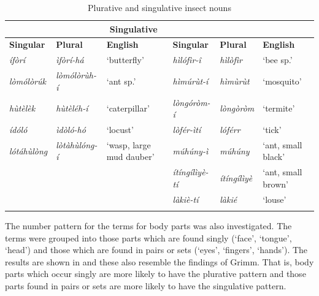 \documentclass[output=paper]{langsci/langscibook}
\begin{document}
\begin{table}
\begin{tabularx}{\textwidth}{llXllX}
\lsptoprule

\multicolumn{3}{c}{\textbf{Plurative}} & \multicolumn{3}{c}{\textbf{Singulative}}\\ \midrule
 \textbf{Singular} & \textbf{Plural} & \textbf{English} & \textbf{Singular} & \textbf{Plural} & \textbf{English}\\ \midrule
\itshape \'{i}f\`{o}r\'{i} & \itshape \`{i}f\`{o}r\'{i}-h\'{a} & ‘butterfly’ & \itshape h\`{i}l\'{o}f\`{i}r-\^{i} & \itshape h\`{i}l\`{o}f\`{i}r & ‘bee sp.’\\
\itshape l\`{o}m\'{o}l\`{o}r\'{u}k & \itshape l\`{o}m\'{o}l\`{o}r\`{u}h-\'{i} & ‘ant sp.’ & \itshape h\`{i}m\'{u}r\`{u}t-\'{i} & \itshape h\`{i}m\`{u}r\`{u}t & ‘mosquito’\\
\itshape h\`{u}t\`{e}l\`{e}k & \itshape h\`{u}t\`{e}l\'{e}h-\'{i} & ‘caterpillar’ & \itshape l\`{o}ng\'{o}r\`{o}m-\'{i} & \itshape l\`{o}ng\`{o}r\`{o}m & ‘termite’\\
\itshape \'{i}d\'{o}l\'{o} & \itshape \`{i}d\`{o}l\'{o}-h\'{o} & ‘locust’ & \itshape l\`{o}f\'{e}r-\`{i}t\'{i} & \itshape l\'{o}f\'{e}rr & ‘tick’\\
\itshape l\'{o}t\'{a}h\`{u}l\`{o}ng & \itshape l\`{o}t\`{a}h\`{u}l\'{o}ng-\'{i} & ‘wasp, large mud dauber’ & \itshape m\'{u}h\'{u}ny-\`{i} & \itshape m\'{u}h\'{u}ny & ‘ant, small black’\\
&  &  & \itshape \'{i}t\'{i}ng\'{i}l\`{i}y\`{e}-t\'{i} & \itshape \'{i}t\'{i}ng\'{i}l\`{i}y\`{e} & ‘ant, small brown’\\
&  &  & \itshape l\`{a}ki\`{e}-t\'{i} & \itshape l\`{a}ki\'{e} & ‘louse’\\
\lspbottomrule
\end{tabularx}
\caption{Plurative and singulative insect nouns}
\label{tab:moodie:7}
\end{table}

The number pattern for the terms for body parts was also investigated. The terms were grouped into those parts which are found singly (‘face’, ‘tongue’, ‘head’) and those which are found in pairs or sets (‘eyes’, ‘fingers’, ‘hands’). The results are shown in  and these also resemble the findings of Grimm.  That is, body parts which occur singly are more likely to have the plurative pattern and those parts found in pairs or sets are more likely to have the singulative pattern. 
\end{document}

